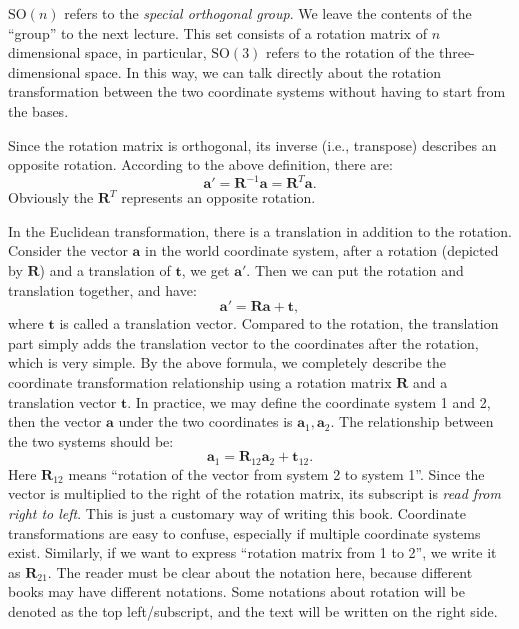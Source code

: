 $\mathrm{SO}(n) $ refers to the \textit {special orthogonal group}. We leave the contents of the ``group'' to the next lecture. This set consists of a rotation matrix of $ n $ dimensional space, in particular, $\mathrm {SO}(3)$ refers to the rotation of the three-dimensional space. In this way, we can talk directly about the rotation transformation between the two coordinate systems without having to start from the bases.

Since the rotation matrix is orthogonal, its inverse (i.e., transpose) describes an opposite rotation. According to the above definition, there are:
\begin{equation}
\mathbf{a} '= \mathbf{R}^{-1} \mathbf{a} = \mathbf{R}^{T} \mathbf{a}.
\end{equation}
Obviously the $ \mathbf{R}^T $ represents an opposite rotation.

In the Euclidean transformation, there is a translation in addition to the rotation. Consider the vector $ \mathbf{a} $ in the world coordinate system, after a rotation (depicted by $ \mathbf{R} $) and a translation of $ \mathbf{t} $, we get $ \mathbf{a}' $. Then we can put the rotation and translation together, and have:
\begin{equation}
\label{eq:RT}
\mathbf{a} '= \mathbf{R} \mathbf{a} + \mathbf{t},
\end{equation}
where $ \mathbf{t} $ is called a translation vector. Compared to the rotation, the translation part simply adds the translation vector to the coordinates after the rotation, which is very simple. By the above formula, we completely describe the coordinate transformation relationship using a rotation matrix $ \mathbf{R} $ and a translation vector $ \mathbf{t}$. In practice, we may define the coordinate system 1 and 2, then the vector $ \mathbf{a} $ under the two coordinates is $ \mathbf{a}_1, \mathbf{a}_2 $. The relationship between the two systems should be:
\begin{equation}
\mathbf{a}_1 = \mathbf{R}_{12} \mathbf{a}_2 + \mathbf{t}_{12}.
\end{equation}
Here $ \mathbf{R}_{12} $ means ``rotation of the vector from system 2 to system 1''. Since the vector is multiplied to the right of the rotation matrix, its subscript is \textit{read from right to left}. This is just a customary way of writing this book. Coordinate transformations are easy to confuse, especially if multiple coordinate systems exist. Similarly, if we want to express ``rotation matrix from 1 to 2'', we write it as $ \mathbf{R}_{21}$. The reader must be clear about the notation here, because different books may have different notations. Some notations about rotation will be denoted as the top left/subscript, and the text will be written on the right side.

